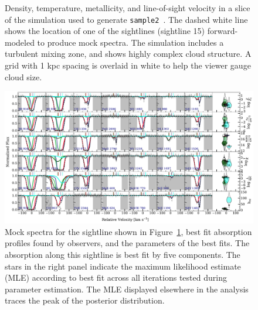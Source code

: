 \documentclass[fleqn,usenatbib]{mnras}
\begin{document}
\begin{figure}
    \caption{
    Density, temperature, metallicity, and line-of-sight velocity in a slice of the simulation used to generate \texttt{sample2}~\citep{mandelker2020Instability}.
    The dashed white line shows the location of one of the sightlines (sightline 15) forward-modeled to produce mock spectra.
    The simulation includes a turbulent mixing zone, and shows highly complex cloud structure.
    A grid with 1 kpc spacing is overlaid in white to help the viewer gauge cloud size.
    }
    \label{f: sample2 ray 15}
\end{figure}

\begin{figure}
    \centering
    \includegraphics[width=\textwidth]{figures/sample2/best_fits/0015.pdf}
    \caption{
    Mock spectra for the sightline shown in Figure~\ref{f: sample2 ray 15},
    best fit absorption profiles found by observers,
    and the parameters of the best fits.
    The absorption along this sightline is best fit by five components.
    The stars in the right panel indicate the maximum likelihood estimate (MLE) according to best fit across all iterations tested during parameter estimation.
    The MLE displayed elsewhere in the analysis traces the peak of the posterior distribution.
    }
    \label{f: sample2 spectrum 15}
    \end{figure}
\end{document}
